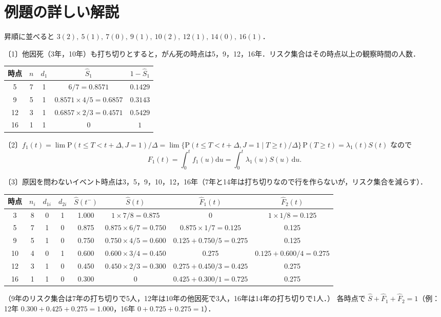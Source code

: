 \documentclass[a4paper,11pt,openany]{ltjsbook}
\newenvironment{kaitou}[1]{%
  \par\medskip\noindent
  \begin{tcolorbox}[enhanced,breakable,colback=bkgray!3,colframe=bkgray!60,boxrule=0.4pt,
    left=4pt,right=4pt,top=2pt,bottom=2pt,arc=1pt,
    title={\cref{#1}の解答},fonttitle=\bfseries\small,coltitle=white,colbacktitle=bkgray!80]}%
  {\end{tcolorbox}\par}
\newcommand{\Prob}{\mathrm{P}}
\newcommand{\dd}{\mathrm{d}}
\begin{document}
\section{例題の詳しい解説}\label{sec:m05-kaisetsu}
\begin{kaitou}{reidai:m05-1}
昇順に並べると $3(2),\ 5(1),\ 7(0),\ 9(1),\ 10(2),\ 12(1),\ 14(0),\ 16(1)$．

〔1〕他因死（3年，10年）も打ち切りとすると，がん死の時点は5，9，12，16年．リスク集合はその時点以上の観察時間の人数．
\begin{center}\small
\begin{tabular}{@{}ccccc@{}}
\toprule
時点 & $n$ & $d_1$ & $\hat S_1$ & $1-\hat S_1$\\
\midrule
5 & 7 & 1 & $6/7=0.8571$ & $0.1429$\\
9 & 5 & 1 & $0.8571\times4/5=0.6857$ & $0.3143$\\
12 & 3 & 1 & $0.6857\times2/3=0.4571$ & $0.5429$\\
16 & 1 & 1 & $0$ & $1$\\
\bottomrule
\end{tabular}
\end{center}

〔2〕$f_1(t)=\lim\Prob(t\le T<t+\Delta,J=1)/\Delta=\lim\{\Prob(t\le T<t+\Delta,J=1\mid T\ge t)/\Delta\}\,\Prob(T\ge t)=\lambda_1(t)S(t)$ なので
\[
F_1(t)=\int_0^tf_1(u)\dd u=\int_0^t\lambda_1(u)S(u)\,\dd u .
\]

〔3〕原因を問わないイベント時点は3，5，9，10，12，16年（7年と14年は打ち切りなので行を作らないが，リスク集合を減らす）．
\begin{center}\footnotesize\setlength{\tabcolsep}{4pt}
\begin{tabular}{@{}cccccccc@{}}
\toprule
時点 & $n_i$ & $d_{1i}$ & $d_{2i}$ & $\hat S(t^-)$ & $\hat S(t)$ & $\hat F_1(t)$ & $\hat F_2(t)$\\
\midrule
3 & 8 & 0 & 1 & 1.000 & $1\times7/8=0.875$ & 0 & $1\times1/8=0.125$\\
5 & 7 & 1 & 0 & 0.875 & $0.875\times6/7=0.750$ & $0.875\times1/7=0.125$ & 0.125\\
9 & 5 & 1 & 0 & 0.750 & $0.750\times4/5=0.600$ & $0.125+0.750/5=0.275$ & 0.125\\
10 & 4 & 0 & 1 & 0.600 & $0.600\times3/4=0.450$ & 0.275 & $0.125+0.600/4=0.275$\\
12 & 3 & 1 & 0 & 0.450 & $0.450\times2/3=0.300$ & $0.275+0.450/3=0.425$ & 0.275\\
16 & 1 & 1 & 0 & 0.300 & 0 & $0.425+0.300/1=0.725$ & 0.275\\
\bottomrule
\end{tabular}
\end{center}
（9年のリスク集合は7年の打ち切りで5人，12年は10年の他因死で3人，16年は14年の打ち切りで1人．）
各時点で $\hat S+\hat F_1+\hat F_2=1$（例：12年 $0.300+0.425+0.275=1.000$，16年 $0+0.725+0.275=1$）．


\end{kaitou}
\end{document}
